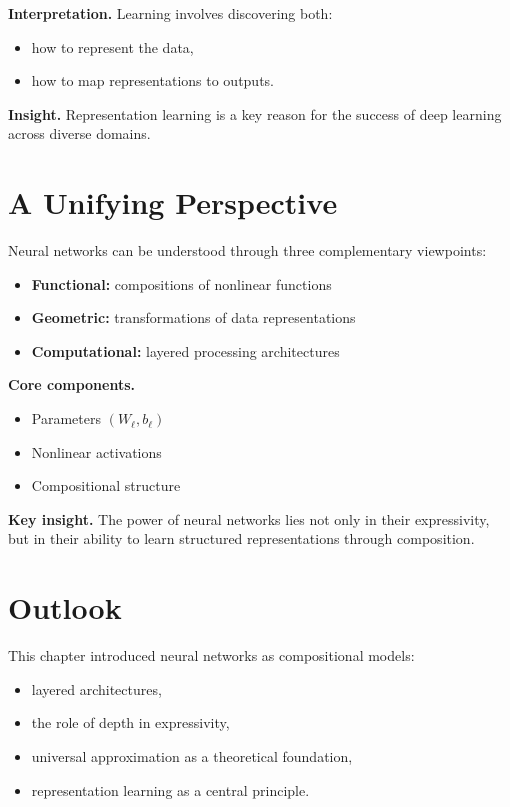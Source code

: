 \noindent
\textbf{Interpretation.}  
Learning involves discovering both:
\begin{itemize}
    \item how to represent the data,
    \item how to map representations to outputs.
\end{itemize}

\medskip

\noindent
\textbf{Insight.}  
Representation learning is a key reason for the success of deep learning across diverse domains.

\section{A Unifying Perspective}

Neural networks can be understood through three complementary viewpoints:

\begin{itemize}
    \item \textbf{Functional:} compositions of nonlinear functions
    \item \textbf{Geometric:} transformations of data representations
    \item \textbf{Computational:} layered processing architectures
\end{itemize}

\medskip

\noindent
\textbf{Core components.}
\begin{itemize}
    \item Parameters $(W_\ell, b_\ell)$
    \item Nonlinear activations
    \item Compositional structure
\end{itemize}

\medskip

\noindent
\textbf{Key insight.}  
The power of neural networks lies not only in their expressivity, but in their ability to learn structured representations through composition.

\section{Outlook}

This chapter introduced neural networks as compositional models:
\begin{itemize}
    \item layered architectures,
    \item the role of depth in expressivity,
    \item universal approximation as a theoretical foundation,
    \item representation learning as a central principle.
\end{itemize}

